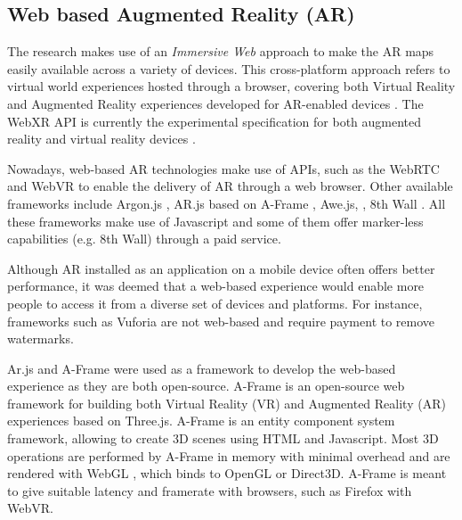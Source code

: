 \documentclass[acmlarge,screen,dvipsnames]{acmart}
\begin{document}




\color{blue}
\subsection{Web based Augmented Reality (AR)} %

The research makes use of an \emph{Immersive Web} approach to make the AR maps easily
available across a variety of devices. This cross-platform approach 
refers to virtual world experiences hosted through a browser, covering both
Virtual Reality and Augmented Reality experiences developed for AR-enabled
devices \cite{imweb}. The WebXR API is currently the experimental
specification for both augmented reality and virtual reality devices
\cite{webxr}.

\color{black}
Nowadays, web-based AR technologies make use of APIs, such as the WebRTC and WebVR
to enable the delivery of AR through a web browser. Other available frameworks include Argon.js \cite{Argon.js}, AR.js based on A-Frame
\cite{aframe}, Awe.js, \cite{Awe.js}, 8th Wall \cite{8th}. All these
frameworks make use of Javascript and some of them offer marker-less
capabilities (e.g. 8th Wall) through a paid service.

Although AR installed as an application on a mobile device often offers better
performance, it was deemed that a web-based experience would enable more people
to access it from a diverse set of devices and platforms. For
instance, frameworks such as Vuforia \cite{Vuforia} are not web-based and
require payment to remove watermarks. 

Ar.js and A-Frame were used as a framework to develop the web-based experience
as they are both open-source. A-Frame is an open-source web framework for
building both Virtual Reality (VR) and Augmented Reality (AR) experiences
based on Three.js. A-Frame is an entity component system framework, allowing to create 3D scenes using HTML and Javascript. Most 3D operations are
performed by A-Frame in memory with minimal overhead and are rendered with
WebGL \cite{webgl}, which binds to OpenGL or Direct3D. A-Frame is meant to
give suitable latency and framerate with browsers, such as Firefox with WebVR.
\end{document}
